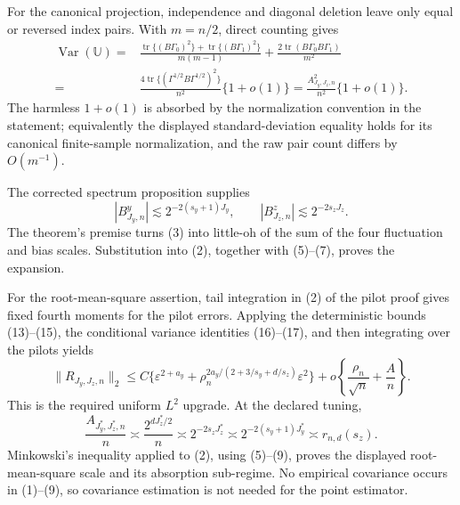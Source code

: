 For the canonical projection, independence and diagonal deletion leave only equal or reversed index pairs. With \(m=n/2\), direct counting gives
\[
\begin{split}
\operatorname{Var}(\mathbb U)
={}&\frac{\operatorname{tr}\{(B\Gamma_0)^2\}+\operatorname{tr}\{(B\Gamma_1)^2\}}{m(m-1)}
+\frac{2\operatorname{tr}(B\Gamma_0B\Gamma_1)}{m^2}\\
={}&\frac{4\operatorname{tr}\{(\Gamma^{1/2}B\Gamma^{1/2})^2\}}{n^2}\{1+o(1)\}
=\frac{A_{J_y,J_z,n}^2}{n^2}\{1+o(1)\}.                            \tag{6}
\end{split}
\]
The harmless \(1+o(1)\) is absorbed by the normalization convention in the statement; equivalently the displayed standard-deviation equality holds for its canonical finite-sample normalization, and the raw pair count differs by \(O(m^{-1})\).

The corrected spectrum proposition supplies
\[
|B^y_{J_y,n}|\lesssim2^{-2(s_y+1)J_y},
\qquad |B^z_{J_z,n}|\lesssim2^{-2s_zJ_z}.                              \tag{7}
\]
The theorem's premise turns (3) into little-oh of the sum of the four fluctuation and bias scales. Substitution into (2), together with (5)--(7), proves the expansion.

For the root-mean-square assertion, tail integration in (2) of the pilot proof gives fixed fourth moments for the pilot errors. Applying the deterministic bounds (13)--(15), the conditional variance identities (16)--(17), and then integrating over the pilots yields
\[
\|R_{J_y,J_z,n}\|_2
\le C\{\varepsilon^{2+a_y}+\rho_n^{2a_y/(2+3/s_y+d/s_z)}\varepsilon^2\}
+o\!\left\{\frac{\rho_n}{\sqrt n}+\frac A n\right\}.             \tag{8}
\]
This is the required uniform \(L^2\) upgrade. At the declared tuning,
\[
\frac{A_{J_y^*,J_z^*,n}}n
\asymp\frac{2^{dJ_z^*/2}}n
\asymp2^{-2s_zJ_z^*}
\asymp2^{-2(s_y+1)J_y^*}
\asymp r_{n,d}(s_z).                                                    \tag{9}
\]
Minkowski's inequality applied to (2), using (5)--(9), proves the displayed root-mean-square scale and its absorption sub-regime. No empirical covariance occurs in (1)--(9), so covariance estimation is not needed for the point estimator.